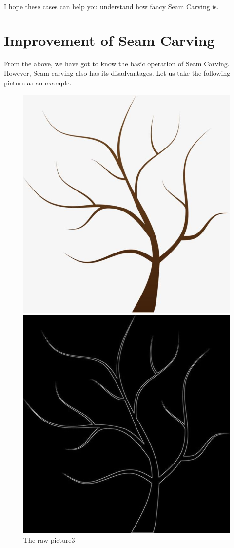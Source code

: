 \documentclass[final]{cvpr}
\begin{document}
I hope these cases can help you understand how fancy Seam Carving is.

\section{Improvement of Seam Carving}
From the above, we have got to know the basic operation of Seam Carving. However, Seam carving also has its disadvantages. Let us take the following picture as an example.

\begin{figure}
\begin{center}
   \includegraphics[scale=0.2]{pics/3-1.jpg}
    \caption{The raw picture3}
    \label{pic3-1}
    \includegraphics[scale=0.2]{pics/3-0.png}

\end{center}
\end{figure}
\end{document}
